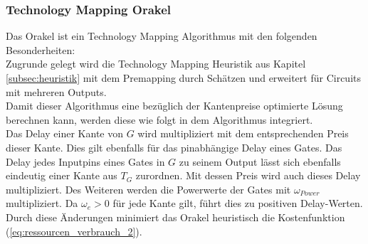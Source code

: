 \documentclass[11pt, a4paper, german]{article}
\newcommand{\TM}{Technology  Mapping }
\begin{document}

\subsubsection{\TM Orakel}
Das Orakel ist ein \TM Algorithmus mit den folgenden Besonderheiten: \\

Zugrunde gelegt wird die \TM Heuristik aus Kapitel \ref{subsec:heuristik} mit dem Premapping durch Schätzen und erweitert für Circuits mit mehreren Outputs. \\
Damit dieser Algorithmus eine bezüglich der Kantenpreise optimierte Lösung berechnen kann, werden diese wie folgt in dem Algorithmus integriert. \\
Das Delay einer Kante von $G$ wird multipliziert mit dem entsprechenden Preis dieser Kante. Dies gilt ebenfalls für das pinabhängige Delay eines Gates. Das Delay jedes Inputpins eines Gates in $G$ zu seinem Output lässt sich ebenfalls eindeutig einer Kante aus $T_G$ zurordnen. Mit dessen Preis wird auch dieses Delay multipliziert. Des Weiteren werden die Powerwerte der Gates mit $\omega_{Power}$ multipliziert. Da $\omega_e >0$ für jede Kante gilt, führt dies zu positiven Delay-Werten. \\
Durch diese Änderungen minimiert das Orakel heuristisch die Kostenfunktion (\ref{eq:ressourcen_verbrauch_2}).
\end{document}
